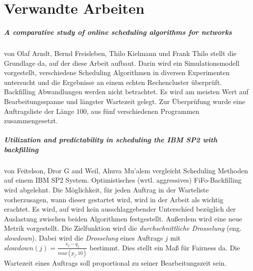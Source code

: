 \chapter{Verwandte Arbeiten}
\label{chap:related_work}
\paragraph{A comparative study of online scheduling algorithms for networks} von Olaf Arndt, Bernd Freisleben, Thilo Kielmann und Frank Thilo \cite{Arn99} stellt die Grundlage da, auf der diese Arbeit aufbaut. Darin wird ein Simulationsmodell vorgestellt, verschiedene Scheduling Algorithmen in diversen Experimenten untersucht und die Ergebnisse an einem echten Rechencluster überprüft. Backfilling Abwandlungen werden nicht betrachtet. Es wird am meisten Wert auf Bearbeitungsspanne und längster Wartezeit gelegt. Zur Überprüfung wurde eine Auftragsliste der Länge 100, aus fünf verschiedenen Programmen zusammengesetzt.

\paragraph{Utilization and predictability in scheduling the IBM SP2 with backfilling}
von Feitelson, Dror G and Weil, Ahuva Mu'alem \cite{optVsCons} vergleicht Scheduling Methoden auf einem IBM SP2 System. Optimistisches (wrtl. aggressives) FiFo-Backfilling wird abgelehnt. Die Möglichkeit, für jeden Auftrag in der Warteliste vorherzusagen, wann dieser gestartet wird, wird in der Arbeit als wichtig erachtet. Es wird, auf wird kein ausschlaggebender Unterschied bezüglich der Auslastung zwischen beiden Algorithmen festgestellt. Außerdem wird eine neue Metrik vorgestellt.
Die Zielfunktion wird die \emph{durchschnittliche Drosselung} (eng. \emph{slowdown}). Dabei wird die \emph{Drosselung} eines Auftrags $j$ mit $slowdown(j) = \frac{s_j - q_j}{max(p_j,10)}$ bestimmt. Dies stellt ein Maß für Fairness da. Die Wartezeit eines Auftrags soll proportional zu seiner Bearbeitungszeit sein.


